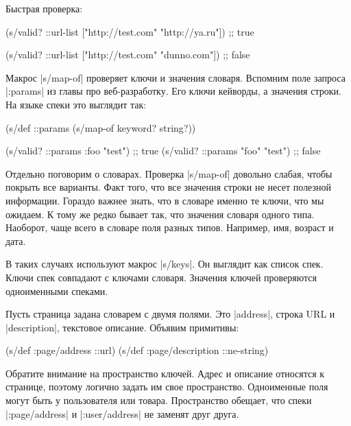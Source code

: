 \noindent
Быстрая проверка:

\begin{english}
  \begin{clojure}
(s/valid? ::url-list ["http://test.com" "http://ya.ru"])
;; true

(s/valid? ::url-list ["http://test.com" "dunno.com"])
;; false
  \end{clojure}
\end{english}

Макрос \spverb|s/map-of| проверяет ключи и значения словаря. Вспомним поле
запроса \spverb|:params|  из главы про веб-разработку. Его
ключи кейворды, а значения строки. На языке спеки это выглядит так:

\begin{english}
  \begin{clojure}
(s/def ::params
  (s/map-of keyword? string?))

(s/valid? ::params {:foo "test"})  ;; true
(s/valid? ::params {"foo" "test"}) ;; false
  \end{clojure}
\end{english}

Отдельно поговорим о словарах. Проверка \spverb|s/map-of| довольно слабая, чтобы
покрыть все варианты. Факт того, что все значения строки не несет полезной
информации. Гораздо важнее знать, что в словаре именно те ключи, что мы
ожидаем. К тому же редко бывает так, что значения словаря одного типа. Наоборот,
чаще всего в словаре поля разных типов. Например, имя, возраст и дата.

В таких случаях используют макрос \spverb|s/keys|. Он выглядит как список
спек. Ключи спек совпадают с ключами словаря. Значения ключей проверяются
одноименными спеками.

Пусть страница задана словарем с двумя полями. Это \spverb|address|, строка URL
и \spverb|description|, текстовое описание. Объявим примитивы:

\begin{english}
  \begin{clojure}
(s/def :page/address ::url)
(s/def :page/description ::ne-string)
  \end{clojure}
\end{english}

Обратите внимание на пространство ключей. Адрес и описание относятся к странице,
поэтому логично задать им свое пространство. Одноименные поля могут быть у
пользователя или товара. Пространство обещает, что спеки \spverb|:page/address|
и \spverb|:user/address| не заменят друг друга.


